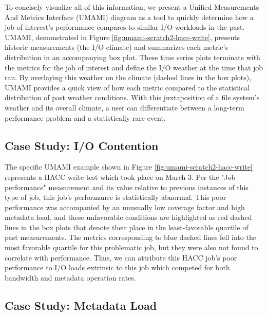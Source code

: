 To concisely visualize all of this information, we present a Unified Measurements And Metrics Interface (UMAMI) diagram as a tool to quickly determine how a job of interest's performance compares to similar I/O workloads in the past.
UMAMI, demonstrated in Figure \ref{fig:umami-scratch2-hacc-write}, presents historic measurements (the I/O climate) and summarizes each metric's distribution in an accompanying box plot.
These time series plots terminate with the metrics for the job of interest and define the I/O weather at the time that job ran.
By overlaying this weather on the climate (dashed lines in the box plots), UMAMI provides a quick view of how each metric compared to the statistical distribution of past weather conditions.
With this juxtaposition of a file system's weather and its overall climate, a user can differentiate between a long-term performance problem and a statistically rare event.%


\subsection{Case Study: I/O Contention}

The specific UMAMI example shown in Figure \ref{fig:umami-scratch2-hacc-write} represents a HACC write test which took place on March 3.
Per the "Job performance" measurement and its value relative to previous instances of this type of job, this job's performance is statistically abnormal.
This poor performance was accompanied by an unusually low coverage factor and high metadata load, and these unfavorable conditions are highlighted as red dashed lines in the box plots that denote their place in the least-favorable quartile of past measurements.
The metrics corresponding to blue dashed lines fell into the most favorable quartile for this problematic job, but they were also not found to correlate with performance.
Thus, we can attribute this HACC job's poor performance to I/O loads extrinsic to this job which competed for both bandwidth and metadata operation rates.

\subsection{Case Study: Metadata Load}

